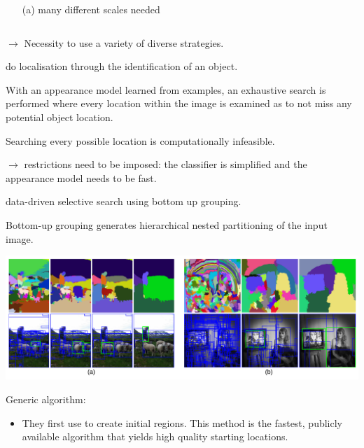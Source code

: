 \begin{frame}[allowframebreaks]
\begin{columns}
\begin{column}{.4\textwidth}
\begin{itemize}
			\item[(a)] many different scales needed
		\end{itemize}

	\end{column}%
\end{columns}

\medskip

$\rightarrow$ Necessity to use a variety of diverse strategies.



	\framebreak

	 do localisation through the identification of an object.

	\bigskip

	 With an appearance model learned
	from examples, an exhaustive search is performed where every location
	within the image is examined as to not miss any potential
	object location.

	\medskip


	Searching every possible location is computationally infeasible.

\medskip

$\rightarrow$ restrictions
	need to be imposed: the classifier is simplified and the appearance
	model needs to be fast.

		\bigskip

	 data-driven selective search using bottom up grouping.

	\framebreak

	Bottom-up grouping generates hierarchical nested partitioning of the input image.


	\begin{center}
	\includegraphics[scale=0.4]{figs/selective_search_partitions.PNG}
	\end{center}

\framebreak

Generic algorithm:
\begin{itemize}
	\item They first use \cite{felzenszwalb2004efficient}
	to create initial regions. This method is the fastest, publicly
	available algorithm that yields high quality starting locations.


\end{itemize}
\end{frame}
